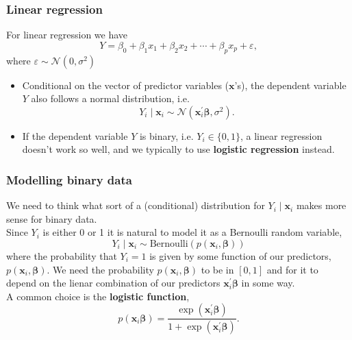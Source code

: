 \documentclass[a4paper]{article}
\begin{document}
\subsubsection{Linear regression}
For linear regression we have
\[
	Y = \beta_0 + \beta_1 x_1 + \beta_2 x_2 + \dotsb + \beta_p x_p + \varepsilon,
\]
where \( \varepsilon \sim \mathcal{N}(0,\sigma^2) \)
\begin{itemize}
	\item Conditional on the vector of predictor variables (\( \symbf{x} \)'s), the dependent variable \( Y \) also follows a normal distribution, i.e.
	\[
		Y_i \mid \symbf{x}_i \sim \mathcal{N}(\symbf{x}_i^\prime \symbf{\beta}, \sigma^2).
	\]
	\item If the dependent variable \( Y \) is binary, i.e. \( Y_i \in \{0,1\} \), a linear regression doesn't work so well, and we typically to use \textbf{logistic regression} instead.
\end{itemize}
\subsubsection{Modelling binary data}
We need to think what sort of a (conditional) distribution for \( Y_i \mid \symbf{x}_i \) makes more sense for binary data.\\
Since \( Y_i \) is either 0 or 1 it is natural to model it as a Bernoulli random variable,
\[
	Y_i \mid \symbf{x}_i \sim \mathrm{Bernoulli}(p(\symbf{x}_i,\symbf{\beta}))
\]
where the probability that \( Y_i = 1 \) is given by some function of our predictors, \( p(\symbf{x}_i,\symbf{\beta}) \).
We need the probability \( p(\symbf{x}_i,\symbf{\beta}) \) to be in \( [0,1] \) and for it to depend on the lienar combination of our predictors \( \symbf{x}_i^\prime \symbf{\beta} \) in some way.\\
A common choice is the \textcolor{myred}{\textbf{logistic function}},
\[
	p(\symbf{x}_i \symbf{\beta}) = \frac{\exp(\symbf{x}_i^\prime \symbf{\beta})}{1+\exp(\symbf{x}^\prime_i\symbf{\beta})}.
\]
\end{document}
